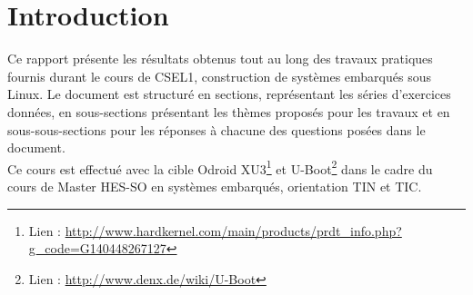 \section{Introduction}
Ce rapport présente les résultats obtenus tout au long des travaux pratiques fournis durant le cours de CSEL1, construction de systèmes embarqués sous Linux. Le document est structuré en sections, représentant les séries d'exercices données, en sous-sections présentant les thèmes proposés pour les travaux et en sous-sous-sections pour les réponses à chacune des questions posées dans le document. \\
Ce cours est effectué avec la cible Odroid XU3\footnote{Lien : \url{http://www.hardkernel.com/main/products/prdt_info.php?g_code=G140448267127}} et U-Boot\footnote{Lien : \url{http://www.denx.de/wiki/U-Boot}} dans le cadre du cours de Master HES-SO en systèmes embarqués, orientation TIN et TIC.